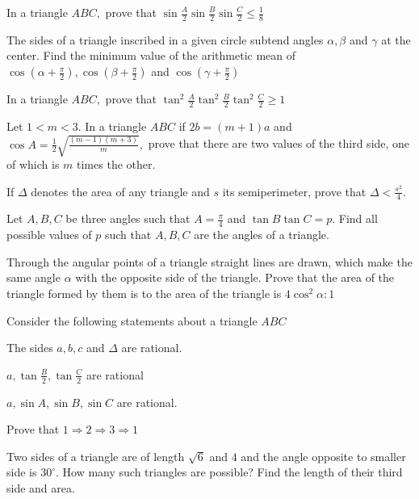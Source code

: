 \item In a triangle $ABC,$ prove that $\sin \frac{A}{2}\sin \frac{B}{2}\sin \frac{C}{2}\leq \frac{1}{8}$

\item The sides of a triangle inscribed in a given circle subtend angles $\alpha, \beta$ and $\gamma$ at the center. Find
   the minimum value of the arithmetic mean of $\cos\left(\alpha + \frac{\pi}{2}\right), \cos\left(\beta + \frac{\pi}{2}\right)$ and
   $\cos\left(\gamma + \frac{\pi}{2}\right)$

\item In a triangle $ABC,$ prove that $\tan^2\frac{A}{2}\tan^2\frac{B}{2}\tan^2\frac{C}{2} \geq 1$

\item Let $1<m<3.$ In a triangle $ABC$ if $2b = (m + 1)a$ and $\cos A = \frac{1}{2}\sqrt{\frac{(m - 1)(m +
   3)}{m}},$ prove that there are two values of the third side, one of which is $m$ times the other.

\item If $\Delta$ denotes the area of any triangle and $s$ its semiperimeter, prove that $\Delta < \frac{s^2}{4}.$

\item Let $A, B, C$ be three angles such that $A = \frac{\pi}{4}$ and $\tan B\tan C = p.$ Find all possible
   values of $p$ such that $A, B, C$ are the angles of a triangle.

\item Through the angular points of a triangle straight lines are drawn, which make the same angle $\alpha$ with the opposite
   side of the triangle. Prove that the area of the triangle formed by them is to the area of the triangle is
   $4\cos^2\alpha:1$

\item Consider the following statements about a triangle $ABC$
  \startitemize[a, 1*broad]
   \item The sides $a,b,c$ and $\Delta$ are rational.

   \item $a, \tan\frac{B}{2}, \tan\frac{ C}{2}$ are rational

   \item $a, \sin A, \sin B, \sin C$ are rational.

   Prove that $1 \Rightarrow 2 \Rightarrow 3 \Rightarrow 1$
   \stopitemize
\item Two sides of a triangle are of length $\sqrt{6}$ and $4$ and the angle opposite to smaller side is $30^\circ.$
   How many such triangles are possible? Find the length of their third side and area.

